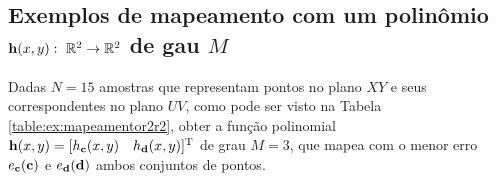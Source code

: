 \subsection{Exemplos de mapeamento com um polinômio
$\VECTOR{h}(x,y):~\mathbb{R}^2 \rightarrow \mathbb{R}^2$ de gau $M$}

\begin{example}[ Mapeamento do polinômio 
$\VECTOR{h}(x,y)$ de grau $M=3$, para $N=15$ amostras:]\label{ex:theo:mapeamentor2r2}
Dadas $N=15$ amostras que representam pontos no plano $XY$ e seus correspondentes 
no plano $UV$, como pode ser visto na Tabela \ref{table:ex:mapeamentor2r2},
obter a função polinomial $\VECTOR{h}(x,y)=[h_{\VECTOR{c}}(x,y)\quad h_{\VECTOR{d}}(x,y)]^{\transpose}$ de grau $M=3$,
que mapea com o menor erro $e_{\VECTOR{c}}(\VECTOR{c})$ e $e_{\VECTOR{d}}(\VECTOR{d})$ ambos conjuntos de pontos.
\end{example}

